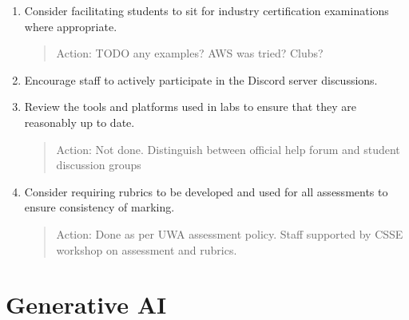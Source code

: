 \begin{enumerate}
\item Consider facilitating students to sit for industry certification examinations where appropriate.

\begin{quote}
{\color{blue}
{Action: TODO any examples?  AWS was tried? Clubs?}
}
\end{quote}

\item Encourage staff to actively participate in the Discord server discussions.
\item Review the tools and platforms used in labs to ensure that they are reasonably up to date.

\begin{quote}
{\color{blue}
{Action: Not done. Distinguish between official help forum and student discussion groups}
}
\end{quote}

\item Consider requiring rubrics to be developed and used for all assessments to ensure consistency of marking.
\begin{quote}
\color{blue}
{Action: Done as per UWA assessment policy.  
Staff supported by CSSE workshop on assessment and rubrics.}
\end{quote}

\end{enumerate}

\section{Generative AI}
